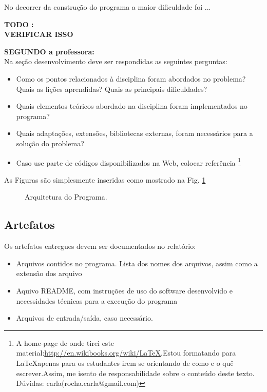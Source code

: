 No decorrer da construção do programa a maior dificuldade foi ...

\textbf{TODO :\\ VERIFICAR ISSO}

\textbf{SEGUNDO a professora:\\}
Na seção desenvolvimento deve ser respondidas as seguintes perguntas:
 
	\begin{itemize}
	 	\item Como os pontos relacionados à disciplina foram abordados no problema? Quais as lições aprendidas? Quais as principais dificuldades?
	 	\item Quais elementos teóricos abordado na disciplina foram implementados no programa?
	 	\item Quais adaptações, extensões, bibliotecas externas, foram necessários para a solução do problema?
	 	\item Caso use parte de códigos disponibilizados na Web, colocar referência \footnote{A home-page de onde tirei
este material:\url{http://en.wikibooks.org/wiki/LaTeX}.Estou formatando para \LaTeX apenas para os estudantes irem se orientando de como e o quê escrever.Assim, me isento de responsabilidade sobre o conteúdo deste texto. Dúvidas: carla(rocha.carla@gmail.com)}
	\end{itemize}
	
	As Figuras são simplesmente inseridas como mostrado na Fig. \ref{Fig1}
	
\begin{figure}[ht]
  \centering
   \caption{Arquitetura do Programa.}
  \label{Fig1}
\end{figure}
 
\subsection{Artefatos}
\label{SebSec:Artefatos}
Os artefatos entregues devem ser documentados no relatório:
\begin{itemize}
\item Arquivos contidos no programa. Lista dos nomes dos arquivos, assim como a extensão dos arquivo
\item Aquivo README, com instruções de uso do software desenvolvido e necessidades técnicas para a execução do programa
\item Arquivos de entrada/saída, caso necessário.
\end{itemize}

